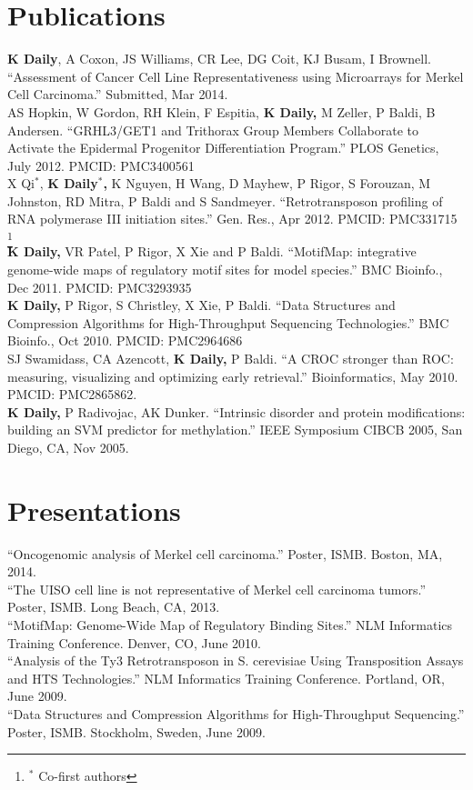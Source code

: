 \documentclass[margin,line]{res}
\begin{document}
\begin{resume}
\section{\sc Publications}
\textbf{K Daily}, A Coxon, JS Williams, CR Lee, DG Coit, KJ Busam, I Brownell. ``Assessment of Cancer Cell Line Representativeness using Microarrays for Merkel Cell Carcinoma.'' Submitted, Mar 2014. \\
AS Hopkin, W Gordon, RH Klein, F Espitia, \textbf{K Daily,} M Zeller, P Baldi, B Andersen. ``GRHL3/GET1 and Trithorax Group Members Collaborate to Activate the Epidermal Progenitor Differentiation Program.'' PLOS Genetics, July 2012. PMCID: PMC3400561\\
X Qi$^*$, \textbf{K Daily$^*$,} K Nguyen, H Wang, D Mayhew, P Rigor, S Forouzan, M Johnston, RD Mitra, P Baldi and S Sandmeyer. ``Retrotransposon profiling of RNA polymerase III initiation sites.'' Gen. Res., Apr 2012. PMCID: PMC331715 \let\thefootnote\relax\footnote{$^*$ Co-first authors} \\
\textbf{K Daily,} VR Patel, P Rigor, X Xie and P Baldi. ``MotifMap: integrative genome-wide maps of regulatory motif sites for model species.'' BMC Bioinfo., Dec 2011. PMCID: PMC3293935\\
\textbf{K Daily,} P Rigor, S Christley, X Xie, P Baldi. ``Data Structures and Compression Algorithms for High-Throughput Sequencing Technologies.'' BMC Bioinfo., Oct 2010. PMCID: PMC2964686\\
SJ Swamidass, CA Azencott, \textbf{K Daily,} P Baldi. ``A CROC stronger than ROC: measuring, visualizing and optimizing early retrieval.'' Bioinformatics, May 2010. PMCID: PMC2865862.\\
\textbf{K Daily,} P Radivojac, AK Dunker. ``Intrinsic disorder and protein modifications: building an SVM predictor for methylation.'' IEEE Symposium CIBCB 2005, San Diego, CA, Nov 2005.

\section{\sc Presentations}
``Oncogenomic analysis of Merkel cell carcinoma.'' Poster, ISMB. Boston, MA, 2014.\\
``The UISO cell line is not representative of Merkel cell carcinoma tumors.'' Poster, ISMB. Long Beach, CA, 2013.\\
``MotifMap: Genome-Wide Map of Regulatory Binding Sites.'' NLM Informatics Training Conference. Denver, CO, June 2010.\\
``Analysis of the Ty3 Retrotransposon in S. cerevisiae Using Transposition Assays and HTS Technologies.'' NLM Informatics Training Conference. Portland, OR, June 2009.\\
``Data Structures and Compression Algorithms for High-Throughput Sequencing.'' Poster, ISMB. Stockholm, Sweden, June 2009.


\end{resume}
\end{document}

